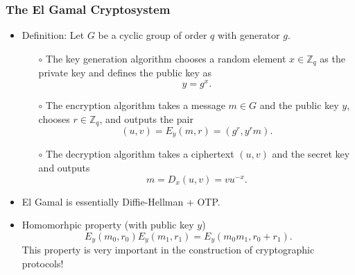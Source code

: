 \documentclass[a4paper]{scrartcl}
\begin{document}
\subsubsection{The El Gamal Cryptosystem}

\begin{itemize}
\item Definition: Let $G$ be a cyclic group of order $q$ with generator $g$.
\begin{itemize}
\item [$\circ$] The key generation algorithm chooses a random element $x \in  \mathbb{Z}_q$ as the private key and defines the public key as $$y = g^x.$$
\item [$\circ$] The encryption algorithm takes a message $m \in G$ and the public key $y$, chooses $r \in \mathbb{Z}_q$, and outputs the pair $$(u,v) = E_y(m,r) = (g^r,y^rm).$$
\item [$\circ$] The decryption algorithm takes a ciphertext $(u,v)$ and the secret key and outputs $$m = D_x(u,v) = vu^{-x}.$$
\end{itemize}
\item El Gamal is essentially Diffie-Hellman + OTP.
\item Homomorhpic property (with public key $y$) $$E_y(m_0,r_0)E_y(m_1,r_1) = E_y(m_0m_1,r_0 +r_1).$$ This property is very important in the construction of cryptographic protocols!
\end{itemize}
\end{document}
